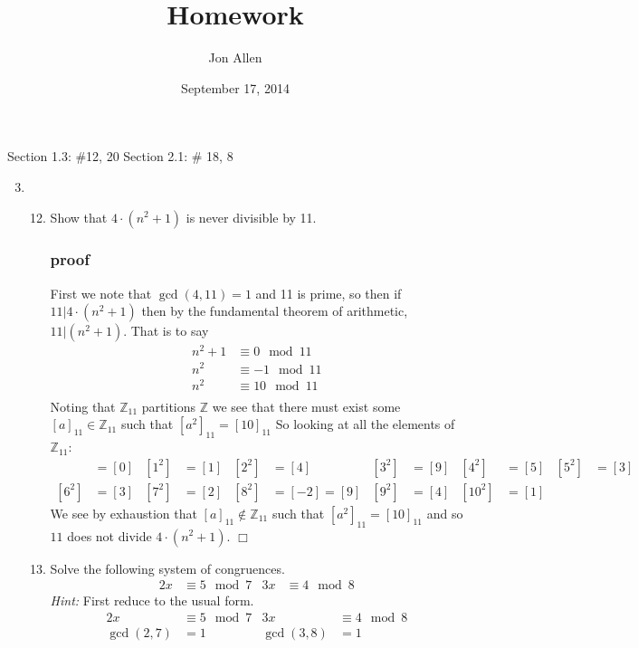 \documentclass[letterpaper]{article}
\begin{document}
\title{Homework}
\date{September 17, 2014}
\author{Jon Allen}
\maketitle
Section 1.3: \#12, 20
Section 2.1: \# 18, 8
\renewcommand{\labelenumi}{1.\arabic{enumi}}
\renewcommand{\labelenumii}{\arabic{enumii}.}
\renewcommand{\labelenumiii}{(\alph{enumiii})}
\begin{enumerate}
\setcounter{enumi}{2}
\item
\begin{enumerate}
\setcounter{enumii}{11}
\item
Show that $4\cdot(n^2+1)$ is never divisible by 11.
\subsubsection*{proof}
First we note that $\gcd(4,11)=1$ and 11 is prime, so then if $11|4\cdot(n^2+1)$ then by the fundamental theorem of arithmetic, $11|(n^2+1)$.
That is to say
\begin{align*}
  n^2+1&\equiv0\mod11\\
  n^2&\equiv-1\mod11\\
  n^2&\equiv10\mod11\\
\end{align*}
Noting that $\mathbb{Z}_{11}$ partitions $\mathbb{Z}$ we see that there must exist some $[a]_{11}\in\mathbb{Z}_{11}$ such that $[a^2]_{11}=[10]_{11}$ So looking at all the elements of $\mathbb{Z}_{11}$:
\begin{align*}
  [0^2]&=[0]&
  [1^2]&=[1]&
  [2^2]&=[4]&
  [3^2]&=[9]&
  [4^2]&=[5]&
  [5^2]&=[3]\\
  [6^2]&=[3]&
  [7^2]&=[2]&
  [8^2]&=[-2]=[9]&
  [9^2]&=[4]&
  [10^2]&=[1]&
\end{align*}
We see by exhaustion that $[a]_{11}\not\in\mathbb{Z}_{11}$ such that $[a^2]_{11}=[10]_{11}$ and so $11$ does not divide $4\cdot(n^2+1)$.
$\Box$
\setcounter{enumii}{19}
\item
Solve the following system of congruences.
\begin{align*}
  2x&\equiv 5\mod 7&3x&\equiv4\mod 8
\end{align*}
\emph{Hint:} First reduce to the usual form.
\begin{align*}
  2x&\equiv 5\mod 7&3x&\equiv4\mod 8\\
  \gcd(2,7)&=1&\gcd(3,8)&=1\\

\end{align*}
\end{enumerate}
\end{enumerate}
\end{document}
